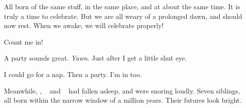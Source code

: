 \documentclass[main.tex]{subfiles}
\begin{document}
\par \Maia All born of the same stuff, in the same place, and at about the same time.  It is truly a time to celebrate.  But we are all weary of a prolonged dawn, and should now rest.  When we awake, we will celebrate properly!

\par \Merope  Count me in!  

\par \Electra A party sounds great. \textit{Yawn}. Just after I get a little shut eye.

\par \Sterope I could go for a nap. Then a party.  I'm in too.

\par \nar Meanwhile, \rmtaygete, \rmalcyone~ and \rmcelaeno~ had fallen asleep, and were snoring loudly.  Seven siblings, all born within the narrow window of a million years.  Their futures look bright.
\end{document}
